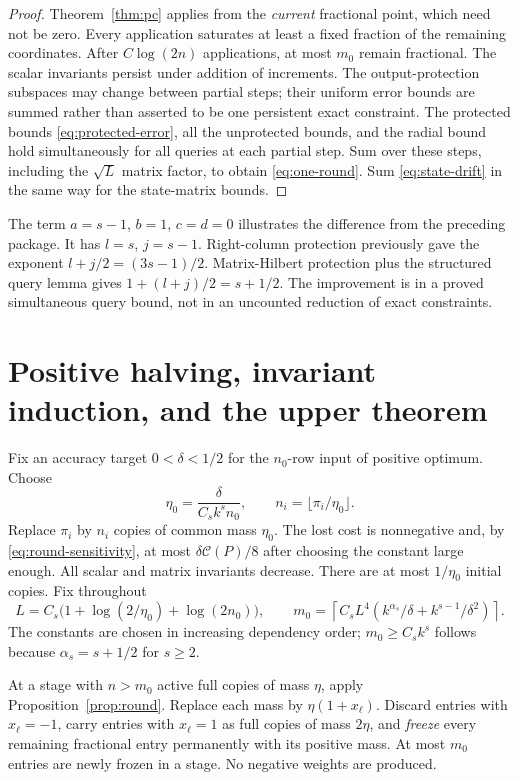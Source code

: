 \documentclass[11pt]{article}
\theoremstyle{remark}\newtheorem{remark}[theorem]{Remark}
\newcommand{\cost}{\mathcal C}\newcommand{\OPT}{\mathsf{OPT}}
\begin{document}
\begin{proof}
Theorem~\ref{thm:pc} applies from the \emph{current} fractional point, which need not be zero. Every application saturates at least a fixed fraction of the remaining coordinates. After $C\log(2n)$ applications, at most $m_0$ remain fractional. The scalar invariants persist under addition of increments. The output-protection subspaces may change between partial steps; their uniform error bounds are summed rather than asserted to be one persistent exact constraint. The protected bounds \eqref{eq:protected-error}, all the unprotected bounds, and the radial bound hold simultaneously for all queries at each partial step. Sum over these steps, including the $\sqrt L$ matrix factor, to obtain \eqref{eq:one-round}. Sum \eqref{eq:state-drift} in the same way for the state-matrix bounds.
\end{proof}

The term $a=s-1$, $b=1$, $c=d=0$ illustrates the difference from the preceding package. It has $l=s$, $j=s-1$. Right-column protection previously gave the exponent $l+j/2=(3s-1)/2$. Matrix-Hilbert protection plus the structured query lemma gives $1+(l+j)/2=s+1/2$. The improvement is in a proved simultaneous query bound, not in an uncounted reduction of exact constraints.

\section{Positive halving, invariant induction, and the upper theorem}\label{sec:upper-finish}
Fix an accuracy target $0<\delta<1/2$ for the $n_0$-row input of positive optimum. Choose
\[
 \eta_0=\frac{\delta}{C_s k^s n_0},\qquad n_i=\lfloor\pi_i/\eta_0\rfloor.
\]
Replace $\pi_i$ by $n_i$ copies of common mass $\eta_0$. The lost cost is nonnegative and, by \eqref{eq:round-sensitivity}, at most $\delta\cost(P)/8$ after choosing the constant large enough. All scalar and matrix invariants decrease. There are at most $1/\eta_0$ initial copies. Fix throughout
\begin{equation}\label{eq:m0}
 L=C_s\bigl(1+\log(2/\eta_0)+\log(2n_0)\bigr),\qquad
 m_0=\left\lceil C_s L^4\left(k^{\alpha_s}/\delta+k^{s-1}/\delta^2\right)\right\rceil.
\end{equation}
The constants are chosen in increasing dependency order; $m_0\ge C_s k^s$ follows because $\alpha_s=s+1/2$ for $s\ge2$.

At a stage with $n>m_0$ active full copies of mass $\eta$, apply Proposition~\ref{prop:round}. Replace each mass by $\eta(1+x_\ell)$. Discard entries with $x_\ell=-1$, carry entries with $x_\ell=1$ as full copies of mass $2\eta$, and \emph{freeze} every remaining fractional entry permanently with its positive mass. At most $m_0$ entries are newly frozen in a stage. No negative weights are produced.
\end{document}
